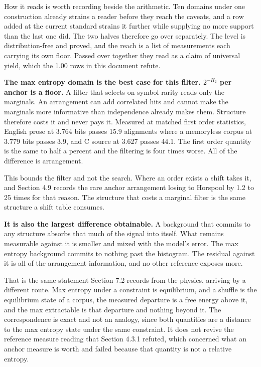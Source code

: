 How it reads is worth recording beside the arithmetic. Ten domains under one construction already strains a reader before they reach the caveats, and a row added at the current standard strains it further while supplying no more support than the last one did. The two halves therefore go over separately. The level is distribution-free and proved, and the reach is a list of measurements each carrying its own floor. Passed over together they read as a claim of universal yield, which the 1.00 rows in this document refute.

\textbf{The max entropy domain is the best case for this filter. \(2^{-H_2}\) per anchor is a floor.} A filter that selects on symbol rarity reads only the marginals. An arrangement can add correlated hits and cannot make the marginals more informative than independence already makes them. Structure therefore costs it and never pays it. Measured at matched first order statistics, English prose at 3.764 bits passes 15.9 alignments where a memoryless corpus at 3.779 bits passes 3.9, and C source at 3.627 passes 44.1. The first order quantity is the same to half a percent and the filtering is four times worse. All of the difference is arrangement.

This bounds the filter and not the search. Where an order exists a shift takes it, and Section 4.9 records the rare anchor arrangement losing to Horspool by 1.2 to 25 times for that reason. The structure that costs a marginal filter is the same structure a shift table consumes.

\textbf{It is also the largest difference obtainable.} A background that commits to any structure absorbs that much of the signal into itself. What remains measurable against it is smaller and mixed with the model's error. The max entropy background commits to nothing past the histogram. The residual against it is all of the arrangement information, and no other reference exposes more.

That is the same statement Section 7.2 records from the physics, arriving by a different route. Max entropy under a constraint is equilibrium, and a shuffle is the equilibrium state of a corpus, the measured departure is a free energy above it, and the max extractable is that departure and nothing beyond it. The correspondence is exact and not an analogy, since both quantities are a distance to the max entropy state under the same constraint. It does not revive the reference measure reading that Section 4.3.1 refuted, which concerned what an anchor measure is worth and failed because that quantity is not a relative entropy.

